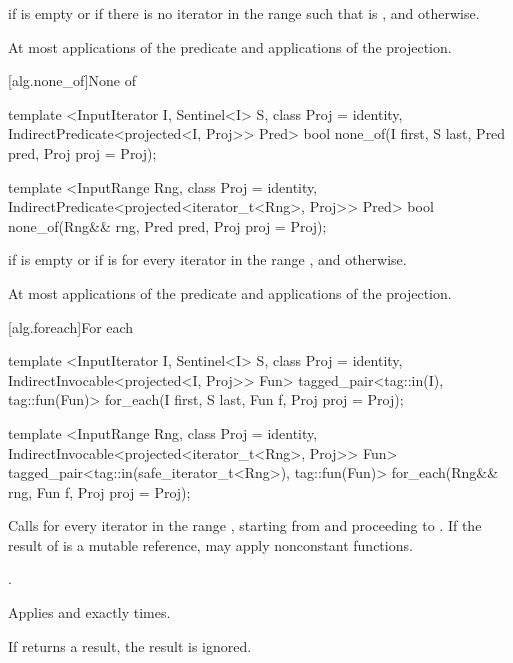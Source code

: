 \begin{itemdescr}
\pnum
\returns {} if  is empty or
if there is no iterator  in the range
 such that
is , and  otherwise.

\pnum
\complexity At most  applications of the predicate
and  applications of the projection.
\end{itemdescr}

[alg.none_of]{None of}

%
\begin{itemdecl}
template <InputIterator I, Sentinel<I> S, class Proj = identity,
    IndirectPredicate<projected<I, Proj>> Pred>
  bool none_of(I first, S last, Pred pred, Proj proj = Proj{});

template <InputRange Rng, class Proj = identity,
    IndirectPredicate<projected<iterator_t<Rng>, Proj>> Pred>
  bool none_of(Rng&& rng, Pred pred, Proj proj = Proj{});
\end{itemdecl}

\begin{itemdescr}
\pnum
\returns {} if
 is empty or if
is  for every iterator  in the range ,
and  otherwise.

\pnum
\complexity At most  applications of the predicate
and  applications of the projection.
\end{itemdescr}

[alg.foreach]{For each}

%
\begin{itemdecl}
template <InputIterator I, Sentinel<I> S, class Proj = identity,
    IndirectInvocable<projected<I, Proj>> Fun>
  tagged_pair<tag::in(I), tag::fun(Fun)>
    for_each(I first, S last, Fun f, Proj proj = Proj{});

template <InputRange Rng, class Proj = identity,
    IndirectInvocable<projected<iterator_t<Rng>, Proj>> Fun>
  tagged_pair<tag::in(safe_iterator_t<Rng>), tag::fun(Fun)>
    for_each(Rng&& rng, Fun f, Proj proj = Proj{});
\end{itemdecl}

\begin{itemdescr}
\pnum
\effects
Calls
 for every iterator
 in the range
,
starting from
and proceeding to
.
\enternote If the result of
 is a mutable reference,  may apply
nonconstant functions.\exitnote

\pnum
\returns
{}.

\pnum
\complexity
Applies  and 
exactly
times.

\pnum
\notes
If  returns a result, the result is ignored.
\end{itemdescr}

